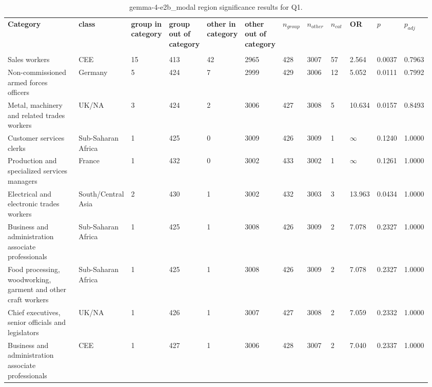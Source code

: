 \clearpage
\begin{landscape}
\begin{table}[p]
\centering
\caption{gemma-4-e2b_modal region significance results for Q1.}
\label{tab:appendix-q1-gemma-4-e2b_modal-region}
\scriptsize
\renewcommand{\arraystretch}{0.92}
\setlength{\tabcolsep}{2pt}
\begin{tabular}{p{0.35\linewidth}p{0.1\linewidth}p{0.05\linewidth}p{0.05\linewidth}p{0.05\linewidth}p{0.05\linewidth}p{0.05\linewidth}p{0.05\linewidth}p{0.05\linewidth}p{0.05\linewidth}p{0.05\linewidth}p{0.06\linewidth}}
\toprule
\textbf{Category} & \textbf{class} & \textbf{group in category} & \textbf{group out of category} & \textbf{other in category} & \textbf{other out of category} & \textbf{$n_{group}$} & \textbf{$n_{other}$} & \textbf{$n_{cat}$} & \textbf{OR} & \textbf{$p$} & \textbf{$p_{adj}$} \\\\
\midrule
Sales workers & CEE & 15 & 413 & 42 & 2965 & 428 & 3007 & 57 & 2.564 & 0.0037 & 0.7963 \\
Non-commissioned armed forces officers & Germany & 5 & 424 & 7 & 2999 & 429 & 3006 & 12 & 5.052 & 0.0111 & 0.7992 \\
Metal, machinery and related trades workers & UK/NA & 3 & 424 & 2 & 3006 & 427 & 3008 & 5 & 10.634 & 0.0157 & 0.8493 \\
Customer services clerks & Sub-Saharan Africa & 1 & 425 & 0 & 3009 & 426 & 3009 & 1 & $\infty$ & 0.1240 & 1.0000 \\
Production and specialized services managers & France & 1 & 432 & 0 & 3002 & 433 & 3002 & 1 & $\infty$ & 0.1261 & 1.0000 \\
Electrical and electronic trades workers & South/Central Asia & 2 & 430 & 1 & 3002 & 432 & 3003 & 3 & 13.963 & 0.0434 & 1.0000 \\
Business and administration associate professionals & Sub-Saharan Africa & 1 & 425 & 1 & 3008 & 426 & 3009 & 2 & 7.078 & 0.2327 & 1.0000 \\
Food processing, woodworking, garment and other craft workers & Sub-Saharan Africa & 1 & 425 & 1 & 3008 & 426 & 3009 & 2 & 7.078 & 0.2327 & 1.0000 \\
Chief executives, senior officials and legislators & UK/NA & 1 & 426 & 1 & 3007 & 427 & 3008 & 2 & 7.059 & 0.2332 & 1.0000 \\
Business and administration associate professionals & CEE & 1 & 427 & 1 & 3006 & 428 & 3007 & 2 & 7.040 & 0.2337 & 1.0000 \\

\end{tabular}
\end{table}
\end{landscape}
